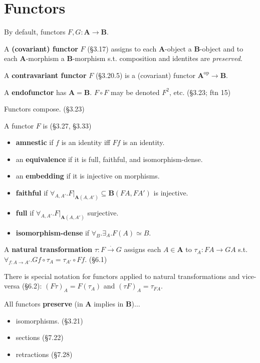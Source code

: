 \documentclass[10pt,twocolumn,letterpaper]{article}
\newcommand{\natto}{\overset{\cdot}{\to}}
\newcommand{\defn}[1]{{\bf #1}}
\begin{document}
\section{Functors}

  By default, functors $F,G : \mathbf{A} \to \mathbf{B}$.

  A \defn{(covariant) functor} $F$ (\S3.17) assigns to each
  $\mathbf{A}$-object a $\mathbf{B}$-object and to each
  $\mathbf{A}$-morphism a $\mathbf{B}$-morphism s.t. composition and
  identites are {\em preserved}.

  A \defn{contravariant functor} $F$ (\S3.20.5) is a (covariant) functor
  $\mathbf{A}^\text{op} \to \mathbf{B}$.

  A \defn{endofunctor} has $\mathbf{A} = \mathbf{B}$.  $F \circ F$ may be
  denoted $F^2$, etc. (\S3.23; ftn 15)

  Functors compose. (\S3.23)

  A functor $F$ is (\S3.27, \S3.33)
  \begin{itemize}
    \item \defn{amnestic} if $f$ is an identity iff $Ff$ is an identity.
    \item an \defn{equivalence} if it is full, faithful, and
      isomorphism-dense.
    \item an \defn{embedding} if it is injective on morphisms.
    \item \defn{faithful} if $\forall_{A,A'} . F\vert_{\mathbf{A}(A,A')}
      \subseteq \mathbf{B}(FA, FA')$ is injective.
    \item \defn{full} if $\forall_{A,A'} . F\vert_{\mathbf{A}(A,A')}$ surjective.
    \item \defn{isomorphism-dense} if $\forall_B . \exists_A . F(A) \simeq B$.
  \end{itemize}

  A \defn{natural transformation} $\tau : F \natto G$ assigns each
  $A \in \mathbf{A}$ to $\tau_A : FA \to GA$ s.t.
  $\forall_{f : A \to A'} . G f \circ \tau_A = \tau_{A'} \circ F f$. (\S6.1)

  There is special notation for functors applied to natural transformations
  and vice-versa (\S6.2): $(F\tau)_A = F(\tau_A)$ and $(\tau F)_A =
  \tau_{FA}$.

  All functors \defn{preserve} (in $\mathbf{A}$ implies in $\mathbf{B}$)$\dots$
    \begin{itemize}
      \item isomorphisms. (\S3.21)
      \item sections (\S7.22)
      \item retractions (\S7.28)
    \end{itemize}
\end{document}
